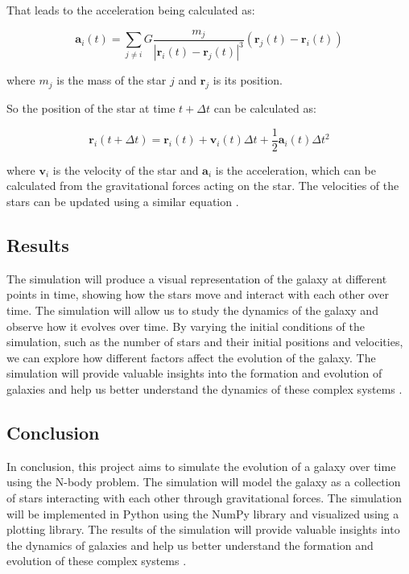 \documentclass[10pt]{article}
\begin{document}
That leads to the acceleration being calculated as:

\begin{equation}
\mathbf{a}_i(t) = \sum_{j \neq i} G \frac{m_j}{|\mathbf{r}_i(t) - \mathbf{r}_j(t)|^3} (\mathbf{r}_j(t) - \mathbf{r}_i(t))
\end{equation}

where $m_j$ is the mass of the star $j$ and $\mathbf{r}_j$ is its position.

So the position of the star at time $t + \Delta t$ can be calculated as:

\begin{equation}
\mathbf{r}_i(t + \Delta t) = \mathbf{r}_i(t) + \mathbf{v}_i(t) \Delta t + \frac{1}{2} \mathbf{a}_i(t) \Delta t^2
\end{equation}

where $\mathbf{v}_i$ is the velocity of the star and $\mathbf{a}_i$ is the acceleration, which can be calculated from the gravitational forces acting on the star. The velocities of the stars can be updated using a similar equation \cite{binney2008galactic}.



\subsection*{Results}

The simulation will produce a visual representation of the galaxy at different points in time, showing how the stars move and interact with each other over time. The simulation will allow us to study the dynamics of the galaxy and observe how it evolves over time. By varying the initial conditions of the simulation, such as the number of stars and their initial positions and velocities, we can explore how different factors affect the evolution of the galaxy. The simulation will provide valuable insights into the formation and evolution of galaxies and help us better understand the dynamics of these complex systems \cite{toomre1972}.

\subsection*{Conclusion}

In conclusion, this project aims to simulate the evolution of a galaxy over time using the N-body problem. The simulation will model the galaxy as a collection of stars interacting with each other through gravitational forces. The simulation will be implemented in Python using the NumPy library and visualized using a plotting library. The results of the simulation will provide valuable insights into the dynamics of galaxies and help us better understand the formation and evolution of these complex systems \cite{springel2005cosmological}.

\printbibliography
\end{document}
